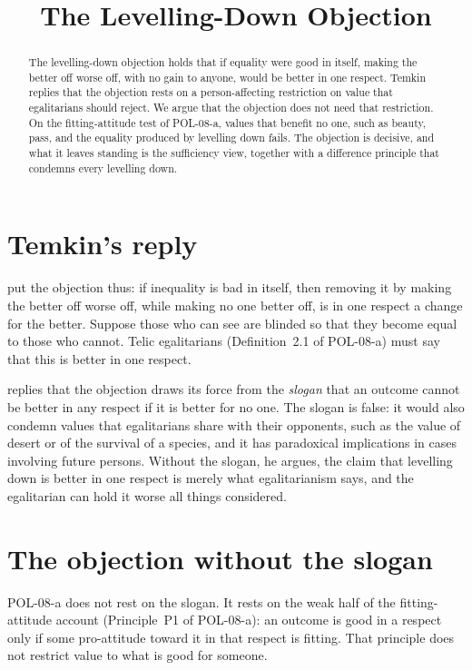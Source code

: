 \documentclass{situationist-preprint}
\title{The Levelling-Down Objection}
\begin{document}
\maketitle

\begin{abstract}
The levelling-down objection holds that if equality were good in itself, making the better off worse off, with no gain to anyone, would be better in one respect. Temkin replies that the objection rests on a person-affecting restriction on value that egalitarians should reject. We argue that the objection does not need that restriction. On the fitting-attitude test of POL-08-a, values that benefit no one, such as beauty, pass, and the equality produced by levelling down fails. The objection is decisive, and what it leaves standing is the sufficiency view, together with a difference principle that condemns every levelling down.
\end{abstract}

\section{Temkin's reply}

\citet{Parfit1997} put the objection thus: if inequality is bad in itself, then removing it by making the better off worse off, while making no one better off, is in one respect a change for the better. Suppose those who can see are blinded so that they become equal to those who cannot. Telic egalitarians (Definition~2.1 of POL-08-a) must say that this is better in one respect.

\citet[ch.~9]{Temkin1993} replies that the objection draws its force from the \emph{slogan} that an outcome cannot be better in any respect if it is better for no one. The slogan is false: it would also condemn values that egalitarians share with their opponents, such as the value of desert or of the survival of a species, and it has paradoxical implications in cases involving future persons. Without the slogan, he argues, the claim that levelling down is better in one respect is merely what egalitarianism says, and the egalitarian can hold it worse all things considered.

\section{The objection without the slogan}

POL-08-a does not rest on the slogan. It rests on the weak half of the fitting-attitude account (Principle~P1 of POL-08-a): an outcome is good in a respect only if some pro-attitude toward it in that respect is fitting. That principle does not restrict value to what is good for someone.
\end{document}
